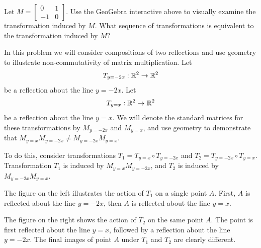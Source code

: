 \documentclass{ximera}
\begin{document}
\begin{exploration}
Let $M=\begin{bmatrix}0&1\\-1&0\end{bmatrix}$.  Use the GeoGebra interactive above to visually examine the transformation induced by $M$.
What sequence of transformations is equivalent to the transformation induced by $M$? 
\begin{multipleChoice}  
\end{multipleChoice} 
\end{exploration}


\begin{example}\label{init:reflectioncomp}  In this problem we will consider compositions of two reflections and use geometry to illustrate non-commutativity of matrix multiplication.  
Let $$T_{y=-2x}:\mathbb{R}^2\rightarrow \mathbb{R}^2$$ be a reflection about the line $y=-2x$.  Let $$T_{y=x}:\mathbb{R}^2\rightarrow \mathbb{R}^2$$ be a reflection about the line $y=x$. We will denote the standard matrices for these transformations by $M_{y=-2x}$ and $M_{y=x}$, and
use geometry to demonstrate that $M_{y=x}M_{y=-2x}\neq M_{y=-2x}M_{y=x}$.  
 
 To do this, consider transformations $T_1=T_{y=x}\circ T_{y=-2x}$ and $T_2=T_{y=-2x}\circ T_{y=x}$.  Transformation $T_1$ is induced by $M_{y=x}M_{y=-2x}$, and $T_2$ is induced by $M_{y=-2x}M_{y=x}$.

The figure on the left illustrates the action of $T_1$ on a single point $A$.  First, $A$ is reflected about the line $y=-2x$, then $A$ is reflected about the line $y=x$.   

The figure on the right shows the action of $T_2$ on the same point $A$.  The point is first reflected about the line $y=x$, followed by a reflection about the line $y=-2x$.  The final images of point $A$ under $T_1$ and $T_2$ are clearly different.

\begin{center}
  \quad\quad
\begin{tikzpicture}[scale=.3]
 

\end{tikzpicture}
\end{center}
\end{example}
\end{document}
